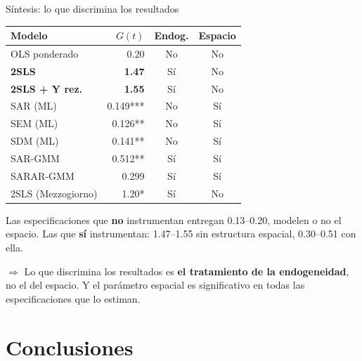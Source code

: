 \documentclass[
  10pt,
  ignorenonframetext,
  aspectratio=169,
  spanish,
]{beamer}
\begin{document}
\begin{frame}{Síntesis: lo que discrimina los resultados}
\protect{}\label{suxedntesis-lo-que-discrimina-los-resultados}
\begin{table}[!h]
\centering\begingroup\fontsize{8}{10}\selectfont

\begin{tabular}[t]{lrcc}
\toprule
Modelo & $G(t)$ & Endog. & Espacio\\
\midrule
OLS ponderado & 0.20 & No & No\\
\textbf{2SLS} & \textbf{1.47} & Sí & No\\
\textbf{2SLS + Y rez.} & \textbf{1.55} & Sí & No\\
SAR (ML) & 0.149*** & No & Sí\\
SEM (ML) & 0.126** & No & Sí\\
SDM (ML) & 0.141** & No & Sí\\
SAR-GMM & 0.512** & Sí & Sí\\
SARAR-GMM & 0.299 & Sí & Sí\\
2SLS (Mezzogiorno) & 1.20* & Sí & No\\
\bottomrule
\end{tabular}
\endgroup{}
\end{table}

\vspace{0.25cm}

\small

Las especificaciones que \textbf{no} instrumentan entregan 0.13--0.20,
modelen o no el espacio. Las que \textbf{sí} instrumentan: 1.47--1.55
sin estructura espacial, 0.30--0.51 con ella.

\vspace{0.15cm}

\(\Rightarrow\) Lo que discrimina los resultados es \textbf{el
tratamiento de la endogeneidad}, no el del espacio. Y el parámetro
espacial es significativo en todas las especificaciones que lo estiman.

\normalsize
\end{frame}

\section{Conclusiones}\label{conclusiones}
\end{document}
